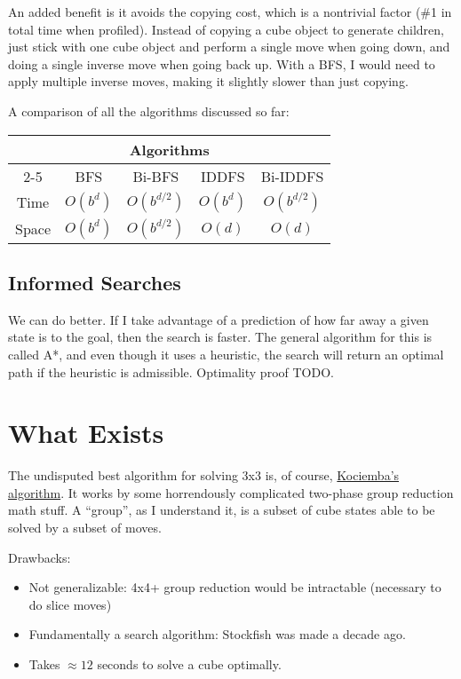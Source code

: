 \documentclass[11pt, oneside]{article}
\begin{document}
An added benefit is it avoids the copying cost, which is a nontrivial
factor (\#1 in total time when profiled). Instead of copying a cube
object to generate children, just stick with one cube object and
perform a single move when going down, and doing a single inverse
move when going back up. With a BFS, I would need to apply multiple
inverse moves, making it slightly slower than just copying.

A comparison of all the algorithms discussed so far:

\begin{tabular} {| c | c | c | c | c |}
  \multicolumn{5}{c}{Algorithms} \\ \cline{2-5}
  \multicolumn{1}{c |}{} & BFS & Bi-BFS & IDDFS & Bi-IDDFS \\ \hline
  Time & \( O(b^d) \) & \( O(b^{d/2}) \) & \( O(b^d) \) & \( O(b^{d/2}) \) \\ \hline
  Space & \(O(b^d) \) & \(O(b^{d/2}) \) & \( O(d) \) & \( O(d) \) \\ \hline
\end{tabular}

\subsection{Informed Searches}
We can do better. If I take advantage of a prediction of how far away a given
state is to the goal, then the search is faster. The general algorithm for this
is called A*, and even though it uses a heuristic, the search will return an
optimal path if the heuristic is admissible. Optimality proof TODO.

\section{What Exists}
The undisputed best algorithm for solving 3x3 is, of course,
\href{http://kociemba.org/cube.htm}{Kociemba's algorithm}. It
works by some horrendously complicated two-phase group reduction
math stuff. A ``group'', as I understand it, is a subset of cube
states able to be solved by a subset of moves.

\newpage

Drawbacks:
\begin{itemize}
  \item Not generalizable: 4x4+ group reduction would be intractable (necessary to do slice moves)
  \item Fundamentally a search algorithm: Stockfish was made a decade ago.
  \item Takes \( \approx 12 \) seconds to solve a cube optimally.
\end{itemize}
\end{document}
